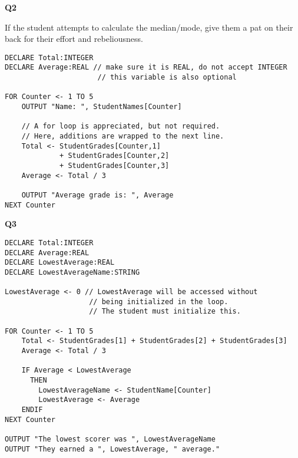 \documentclass[./main.tex]{subfiles}
\begin{document}
\textbf{Q2}

If the student attempts to calculate the median/mode, give them a pat on their back for their effort and rebeliousness.

\begin{verbatim}
DECLARE Total:INTEGER
DECLARE Average:REAL // make sure it is REAL, do not accept INTEGER
                      // this variable is also optional

FOR Counter <- 1 TO 5
    OUTPUT "Name: ", StudentNames[Counter]
    
    // A for loop is appreciated, but not required. 
    // Here, additions are wrapped to the next line.
    Total <- StudentGrades[Counter,1]
             + StudentGrades[Counter,2]
             + StudentGrades[Counter,3]
    Average <- Total / 3

    OUTPUT "Average grade is: ", Average
NEXT Counter
\end{verbatim}   

\textbf{Q3}
\begin{verbatim}
DECLARE Total:INTEGER
DECLARE Average:REAL
DECLARE LowestAverage:REAL
DECLARE LowestAverageName:STRING

LowestAverage <- 0 // LowestAverage will be accessed without
                    // being initialized in the loop.
                    // The student must initialize this.

FOR Counter <- 1 TO 5
    Total <- StudentGrades[1] + StudentGrades[2] + StudentGrades[3]
    Average <- Total / 3

    IF Average < LowestAverage
      THEN
        LowestAverageName <- StudentName[Counter]
        LowestAverage <- Average
    ENDIF
NEXT Counter

OUTPUT "The lowest scorer was ", LowestAverageName
OUTPUT "They earned a ", LowestAverage, " average."
\end{verbatim}
\end{document}

